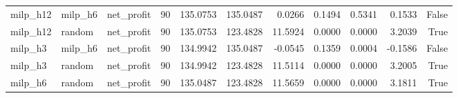 \begin{tabular}{lllrrrrrrrr}
milp_h12 & milp_h6 & net_profit & 90 & 135.0753 & 135.0487 & 0.0266 & 0.1494 & 0.5341 & 0.1533 & False \\
milp_h12 & random & net_profit & 90 & 135.0753 & 123.4828 & 11.5924 & 0.0000 & 0.0000 & 3.2039 & True \\
milp_h3 & milp_h6 & net_profit & 90 & 134.9942 & 135.0487 & -0.0545 & 0.1359 & 0.0004 & -0.1586 & False \\
milp_h3 & random & net_profit & 90 & 134.9942 & 123.4828 & 11.5114 & 0.0000 & 0.0000 & 3.2005 & True \\
milp_h6 & random & net_profit & 90 & 135.0487 & 123.4828 & 11.5659 & 0.0000 & 0.0000 & 3.1811 & True \\
\bottomrule
\end{tabular}
